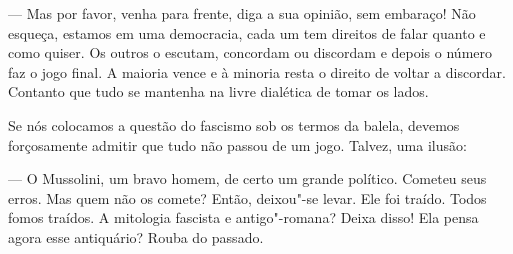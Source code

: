 --- Mas por favor, venha para frente, diga a sua opinião, sem embaraço!
Não esqueça, estamos em uma democracia, cada um tem direitos de falar
quanto e como quiser. Os outros o escutam, concordam ou discordam e
depois o número faz o jogo final. A maioria vence e à minoria resta o
direito de voltar a discordar. Contanto que tudo se mantenha na livre
dialética de tomar os lados.

Se nós colocamos a questão do fascismo sob os termos da balela, devemos
forçosamente admitir que tudo não passou de um jogo. Talvez, uma ilusão:

--- O Mussolini, um bravo homem, de certo um grande político. Cometeu
seus erros. Mas quem não os comete? Então, deixou"-se levar. Ele foi
traído. Todos fomos traídos. A mitologia fascista e antigo"-romana? Deixa
disso! Ela pensa agora esse antiquário? Rouba do passado.

